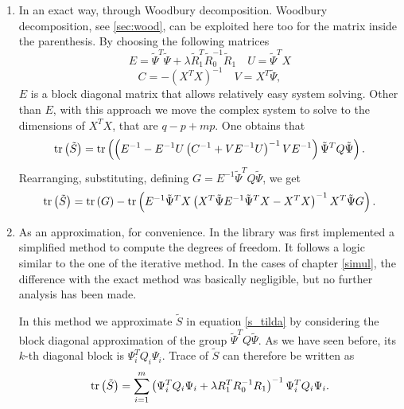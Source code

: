 \begin{enumerate}
	\item In an exact way, through Woodbury decomposition. Woodbury
	      decomposition, see \ref{sec:wood}, can be exploited here too
	      for the matrix inside the parenthesis. By choosing the following matrices
	      \begin{equation}
		      E = \tilde{\Psi}^T\tilde{\Psi} +  \lambda \tilde{R}_1^T
		      \tilde{R}_0^{-1} \tilde{R}_1
		      \quad U =
		      \tilde{\Psi}^TX
	      \end{equation}
	      \begin{equation*}
		      C = - \left( X^TX \right)^{-1}
		      \quad V = X^T \tilde{\Psi},
	      \end{equation*} $E$ is a block diagonal matrix that allows relatively easy system
	      solving. Other than $E$, with this approach we move the complex system to solve
	      to the dimensions of $X^TX$, that are $q-p+mp$. One obtains that
	      \begin{equation}
		      \operatorname*{tr} \left(\tilde{S} \right) =
		      \operatorname*{tr} \left(  \left( E^{-1} - E^{-1}U\left(C^{-1} + V E^{-1}U\right)^{-1}V E^{-1} \right)
		      \tilde{\Psi}^TQ \tilde{\Psi} \right).
	      \end{equation}
	      Rearranging, substituting, defining $G=E^{-1}\tilde{\Psi}^TQ
		      \tilde{\Psi}$, we get
	      \begin{equation}
		      \operatorname*{tr} \left(\tilde{S} \right) =
		      \operatorname*{tr} \left(G\right)  -
		      \operatorname*{tr} \left(  E^{-1}\tilde{\Psi}^TX\left(X^T \tilde{\Psi} E^{-1}\tilde{\Psi}^TX - X^TX\right)^{-1}X^T \tilde{\Psi} G\right).
	      \end{equation}
	\item As an approximation, for convenience. In the library was first implemented a simplified method to
	      compute the degrees of freedom. It follows a logic similar to the one of the
	      iterative method. In the cases of chapter \ref{simul}, the difference with the exact method
	      was basically negligible, but no further analysis has been made.

	      In this method we approximate $\tilde{S}$ in equation \ref{s_tilda} by
	      considering the block diagonal approximation of the group
	      $\tilde{\Psi}^TQ\tilde{\Psi}$. As we have seen before, its $k$-th diagonal
	      block is $\Psi_i^TQ_i\Psi_i$. Trace of $\tilde{S}$ can therefore be written as
	      \begin{equation}
		      \operatorname*{tr} \left(\tilde{S} \right) = \sum_{i=1}^{m} \left( \Psi^T_i Q_i\Psi_i  +  \lambda R_1^T R_0^{-1} R_1\right)^{-1}   \Psi_i^TQ_i\Psi_i .
	      \end{equation}


\end{enumerate}
